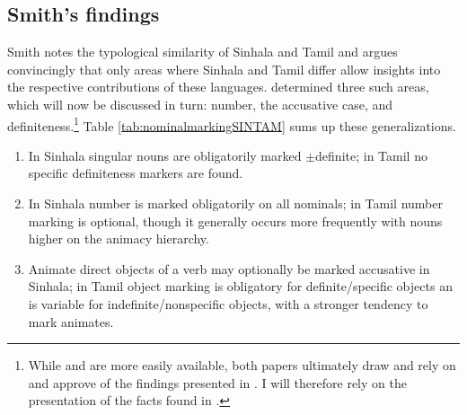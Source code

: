 \documentclass[a4paper,10pt]{article}
\begin{document}
\subsection{Smith's findings}

Smith notes the typological similarity of Sinhala and Tamil and argues convincingly that only areas where Sinhala and Tamil differ allow insights into the respective contributions of these languages. \citet[8]{Smith2003timing} determined three such areas, which will now be discussed in turn: number, the accusative case, and definiteness.\footnote{While
 \citet{SmithEtAl2004} and \citet{SmithEtAl2006cll} are more easily available, both papers ultimately draw and rely on and approve of the findings presented in \citet{Smith2003timing}. 
 I will therefore rely on the presentation of the facts found in \citet{Smith2003timing}.
} 
Table \ref{tab:nominalmarkingSINTAM} sums up these generalizations.
 

\begin{enumerate}
 \item In Sinhala singular nouns are obligatorily marked $\pm$definite; in Tamil no specific definiteness markers are found.
 \item In Sinhala number is marked obligatorily on all nominals; in Tamil number marking is optional, though it generally occurs more frequently with nouns higher on the animacy hierarchy.
 \item Animate direct objects of a verb may optionally be marked accusative in Sinhala; in Tamil object marking is obligatory for definite/specific objects an is variable for indefinite/nonspecific objects, with a stronger tendency to mark animates. \citep[6]{Smith2003timing}
\end{enumerate}
\end{document}
